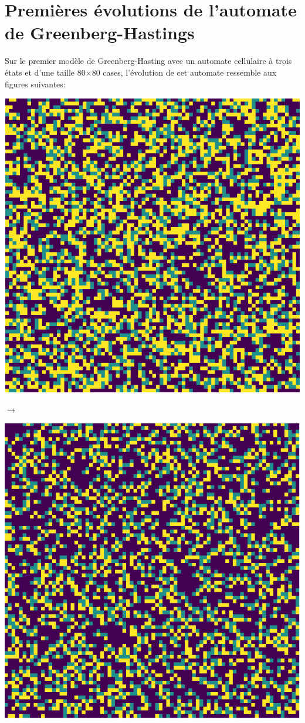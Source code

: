 \documentclass[12pt, a4paper]{article}
\begin{document}
    
    \section{Premières évolutions de l'automate de Greenberg-Hastings}
        Sur le premier modèle de Greenberg-Hasting avec un automate cellulaire à trois états et d'une taille 80$\times$80 cases, l'évolution de cet automate ressemble aux figures suivantes:
        \begin{center}
            \begin{minipage}{.17\linewidth}
                \includegraphics[scale=0.15]{img/part1/step1.png}
            \end{minipage}
            $\rightarrow$
            \begin{minipage}{.17\linewidth}
                \includegraphics[scale=0.15]{img/part1/step2.png}

\end{minipage}
\end{center}
\end{document}
